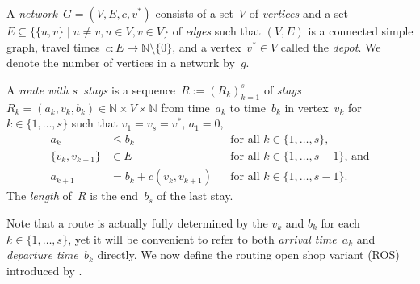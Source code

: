 \documentclass[natbib,sort,smallextended,envcountsame,envcountsect,numbook]{svjour3}
\newcommand{\depo}{v^*}
\newcommand{\nverts}{g}
\newcommand{\arr}{a}
\newcommand{\dep}{b}
\newcommand{\stops}{s}
\newcommand{\Gr}{G}
\begin{document}
\begin{definition}
  A \emph{network}~\(\Gr=(V,E,c,v^*)\) consists of
  a set~\(V\) of \emph{vertices} and
  a set~\(E\subseteq\{\{u,v\}\mid u\ne v, u\in V, v\in V\}\) of \emph{edges}
  such that \((V,E)\) is a connected simple graph,
  travel times~$c\colon E\to\mathbb N\setminus\{0\}$,
  and a vertex~\(v^*\in V\) called the \emph{depot}.
  We denote the number of vertices in a network
  by~\(\nverts\). 
  
  A \emph{route with $\stops$~stays} is
  a sequence~$R:=(R_k)_{k=1}^\stops$
  of \emph{stays}~$R_k=(\arr_k,v_k,\dep_k)\in\mathbb N\times V\times\mathbb N$
  from time~$\arr_k$ to time~$\dep_k$
  in vertex~$v_k$ for $k\in\{1,\dots,\stops\}$
  such that \(v_1=v_\stops=\depo\), \(a_1=0\),
  \begin{align*}
    a_k&\leq b_k&&\text{for all }k\in\{1,\dots,\stops\},\\
    \{v_k,v_{k+1}\}&\in E&&\text{for all }k\in\{1,\dots,\stops-1\}\text{, and}\\
    a_{k+1}&=\dep_k+c(v_k,v_{k+1})&&\text{for all }k\in\{1,\dots,\stops-1\}.
  \end{align*}
  The \emph{length} of~$R$ is the end~$\dep_\stops$ of the last stay.  
\end{definition}

\noindent
{}
Note that a route is actually fully determined
by the \(v_k\) and \(b_k\) for each~\(k\in\{1,\dots,\stops\}\),
yet it will be convenient to refer to both
\emph{arrival time~\(a_k\)} and \emph{departure time~\(b_k\)} directly.
We now define the routing open shop variant (ROS) introduced by \citet{ABC06}.
\end{document}
